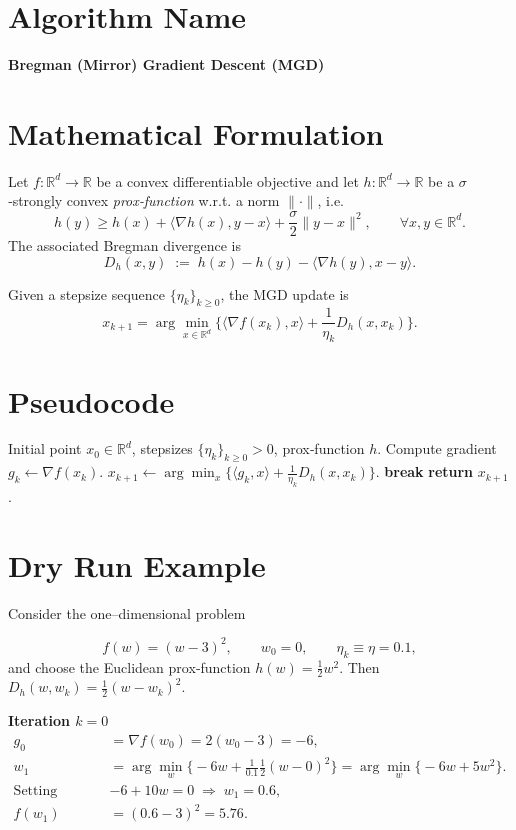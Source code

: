 \documentclass[11pt]{article}
\newcommand{\grad}{\nabla}
\newcommand{\D}{D_{h}}
\newcommand{\inner}[2]{\langle #1,#2\rangle}
\newcommand{\R}{\mathbb{R}}
\begin{document}
\section*{Algorithm Name}
\textbf{Bregman (Mirror) Gradient Descent (MGD)}  

\section*{Mathematical Formulation}
Let $f:\R^{d}\rightarrow\R$ be a convex differentiable objective and let  
$h:\R^{d}\rightarrow\R$ be a $\sigma$‑strongly convex \emph{prox‑function} w.r.t. a norm $\|\cdot\|$,
i.e.
\[
h(y)\ge h(x)+\inner{\grad h(x)}{y-x}+\frac{\sigma}{2}\|y-x\|^{2},\qquad\forall x,y\in\R^{d}.
\]
The associated Bregman divergence is
\[
\D(x,y)\;:=\;h(x)-h(y)-\inner{\grad h(y)}{x-y}.
\tag{1}
\]

Given a stepsize sequence $\{\eta_{k}\}_{k\ge0}$, the MGD update is
\[
\boxed{
x_{k+1}= \arg\min_{x\in\R^{d}}
\Big\{ \inner{\grad f(x_{k})}{x}
        +\frac{1}{\eta_{k}}\D(x,x_{k})\Big\}.
}
\tag{2}
\]

\section*{Pseudocode}
\begin{algorithm}[H]
\caption{Bregman (Mirror) Gradient Descent}
\begin{algorithmic}[1]
\Require Initial point $x_{0}\in\R^{d}$, stepsizes $\{\eta_{k}\}_{k\ge0}>0$, prox‑function $h$.
    \State Compute gradient $g_{k}\gets\grad f(x_{k})$.
    \State $x_{k+1}\gets\displaystyle\arg\min_{x}
            \Big\{ \inner{g_{k}}{x}+\frac{1}{\eta_{k}}\D(x,x_{k})\Big\}$.
        \State \textbf{break}
    \EndIf
\EndFor
\State \textbf{return} $x_{k+1}$.
\end{algorithmic}
\end{algorithm}

\section*{Dry Run Example}
Consider the one–dimensional problem  

\[
f(w)=(w-3)^{2},\qquad w_{0}=0,\qquad \eta_{k}\equiv\eta=0.1,
\]
and choose the Euclidean prox‑function $h(w)=\tfrac12 w^{2}$.
Then $\D(w,w_{k})=\tfrac12 (w-w_{k})^{2}$.

\medskip
\textbf{Iteration $k=0$}
\begin{align*}
g_{0}&=\grad f(w_{0})=2(w_{0}-3)=-6,\\[4pt]
w_{1}&=\arg\min_{w}\Big\{-6w+\frac{1}{0.1}\tfrac12(w-0)^{2}\Big\}
      =\arg\min_{w}\big\{-6w+5w^{2}\big\}.\\
\text{Setting derivative to zero: }&-6+10w=0\;\Rightarrow\; w_{1}=0.6,\\
f(w_{1})&=(0.6-3)^{2}=5.76.
\end{align*}
\end{document}
